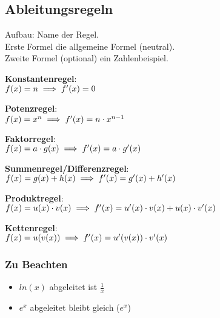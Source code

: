 \subsection{Ableitungsregeln}
\label{sec:ableitungs_regeln}
Aufbau: Name der Regel. \\
Erste Formel die allgemeine Formel (neutral). \\
Zweite Formel (optional) ein Zahlenbeispiel.

\begin{multicols}{2}

\textbf{Konstantenregel}: \\
$
f(x) = n \\
\implies f'(x) = 0
$

\vspace{0.5cm}

\textbf{Potenzregel}: \\
$
f(x) = x^n \\
\implies f'(x) = n\cdot x^{n - 1}
$

\vspace{0.5cm}

\textbf{Faktorregel}: \\
$
f(x) = a\cdot g(x) \\
\implies f'(x) = a\cdot g'(x)
$

\columnbreak

\textbf{Summenregel/Differenzregel}: \\
$
f(x) = g(x) + h(x) \\
\implies f'(x) = g'(x) + h'(x) 
$

\vspace{0.5cm}

\textbf{Produktregel}: \\
$
f(x) = u(x) \cdot v(x) \\
\implies f'(x) = u'(x) \cdot v(x) + u(x) \cdot v'(x)
$ 

\vspace{0.5cm}

\textbf{Kettenregel}: \\
$
f(x) = u(v(x)) \\
\implies f'(x) = u'(v(x)) \cdot v'(x)
$

\end{multicols}

\subsubsection{Zu Beachten}
\begin{itemize}
    \item $ln(x)$ abgeleitet ist $\frac{1}{x}$
    \item $e^x$ abgeleitet bleibt gleich ($e^x$)
\end{itemize}

